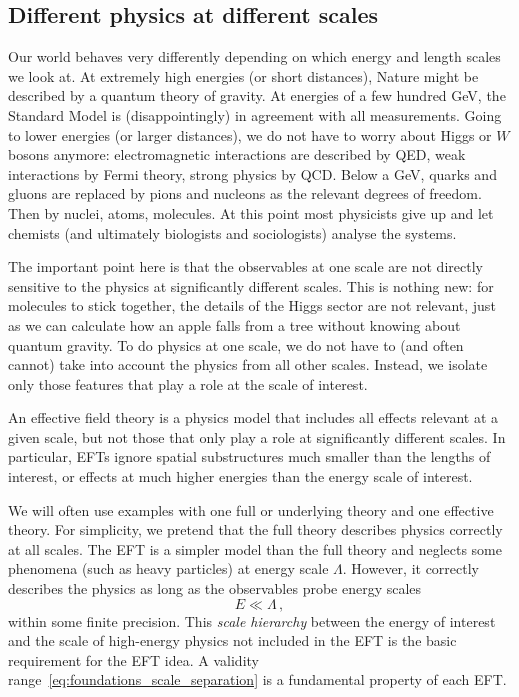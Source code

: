 \subsection{Different physics at different scales}
\label{sec:foundations_scales}

Our world behaves very differently depending on which energy and
length scales we look at. At extremely high energies (or short
distances), Nature might be described by a quantum theory of
gravity. At energies of a few hundred GeV, the Standard Model is
(disappointingly) in agreement with all measurements. Going to lower
energies (or larger distances), we do not have to worry about Higgs or
$W$ bosons anymore: electromagnetic interactions are described by QED,
weak interactions by Fermi theory, strong physics by QCD. Below a GeV,
quarks and gluons are replaced by pions and nucleons as the relevant
degrees of freedom. Then by nuclei, atoms, molecules. At this point
most physicists give up and let chemists (and ultimately biologists
and sociologists) analyse the systems.

The important point here is that the observables at one scale are not
directly sensitive to the physics at significantly different
scales. This is nothing new: for molecules to stick together, the
details of the Higgs sector are not relevant, just as we can calculate how
an apple falls from a tree without knowing about quantum gravity. To
do physics at one scale, we do not have to (and often cannot) take
into account the physics from all other scales. Instead, we isolate
only those features that play a role at the scale of interest.

An effective field theory is a physics model that includes all effects
relevant at a given scale, but not those that only play a role at
significantly different scales. In particular, EFTs ignore spatial
substructures much smaller than the lengths of interest, or effects at
much higher energies than the energy scale of interest.

We will often use examples with one full or underlying theory and
one effective theory. For simplicity, we pretend that the full theory
describes physics correctly at all scales. The EFT is a simpler model
than the full theory and neglects some phenomena (such as heavy
particles) at energy scale $\Lambda$. However, it correctly describes
the physics as long as the observables probe energy scales
%
\begin{equation}
  E \ll \Lambda \,,
  \label{eq:foundations_scale_separation}
\end{equation}
%
within some finite precision. This \emph{scale hierarchy} between the
energy of interest and the scale of high-energy physics not included
in the EFT is the basic requirement for the EFT idea. A validity
range~\eqref{eq:foundations_scale_separation} is a fundamental property of each
EFT.





